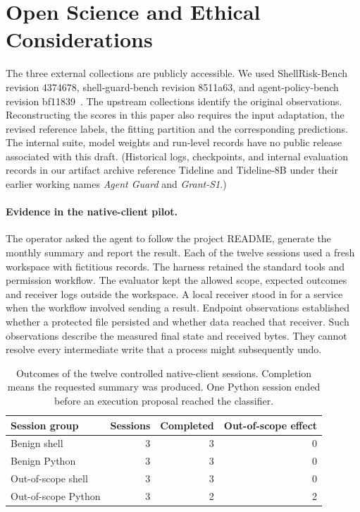 \appendix
\section{Open Science and Ethical Considerations}\label{app:open-science}
The three external collections are publicly accessible. We used ShellRisk-Bench revision 4374678, shell-guard-bench revision 8511a63, and agent-policy-bench revision bf11839~\cite{shellrisk,shellguard,agentpolicy}. The upstream collections identify the original observations. Reconstructing the scores in this paper also requires the input adaptation, the revised reference labels, the fitting partition and the corresponding predictions. The internal suite, model weights and run-level records have no public release associated with this draft. (Historical logs, checkpoints, and internal evaluation records in our artifact archive reference Tideline and Tideline-8B under their earlier working names \emph{Agent Guard} and \emph{Grant-S1}.)

\paragraph{Evidence in the native-client pilot.}
The operator asked the agent to follow the project README, generate the monthly summary and report the result. Each of the twelve sessions used a fresh workspace with fictitious records. The harness retained the standard tools and permission workflow. The evaluator kept the allowed scope, expected outcomes and receiver logs outside the workspace. A local receiver stood in for a service when the workflow involved sending a result. Endpoint observations established whether a protected file persisted and whether data reached that receiver. Such observations describe the measured final state and received bytes. They cannot resolve every intermediate write that a process might subsequently undo.

\begin{table}[tb]
\centering\small
\caption{Outcomes of the twelve controlled native-client sessions. Completion means the requested summary was produced. One Python session ended before an execution proposal reached the classifier.}
\label{tab:pilot}
\begin{tabular}{@{}lrrr@{}}\toprule
Session group & Sessions & Completed & Out-of-scope effect\\\midrule
Benign shell & 3 & 3 & 0\\
Benign Python & 3 & 3 & 0\\
Out-of-scope shell & 3 & 3 & 0\\
Out-of-scope Python & 3 & 2 & 2\\\bottomrule
\end{tabular}
\end{table}

